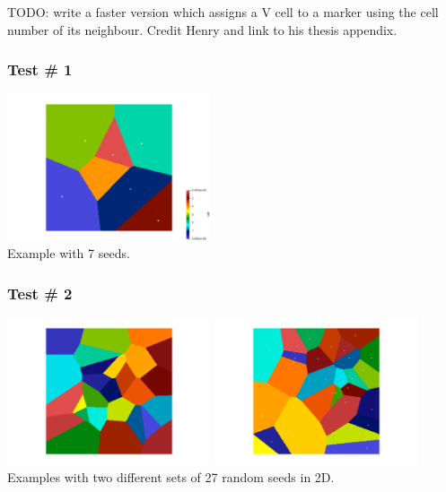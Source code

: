 TODO: write a faster version which assigns a V cell to a marker using the cell number of its neighbour. 
Credit Henry and link to his thesis appendix.


\subsubsection*{Test \# 1}

\begin{center}
\includegraphics[width=6cm]{python_codes/fieldstone_125/results/diagram.png}\\
{\captionfont Example with 7 seeds.}
\end{center}


\subsubsection*{Test \# 2}

\begin{center}
\includegraphics[width=6cm]{python_codes/fieldstone_125/results/test2_a}
\includegraphics[width=6cm]{python_codes/fieldstone_125/results/test2_b}\\
{\captionfont Examples with two different sets of 27 random seeds in 2D.}
\end{center}

